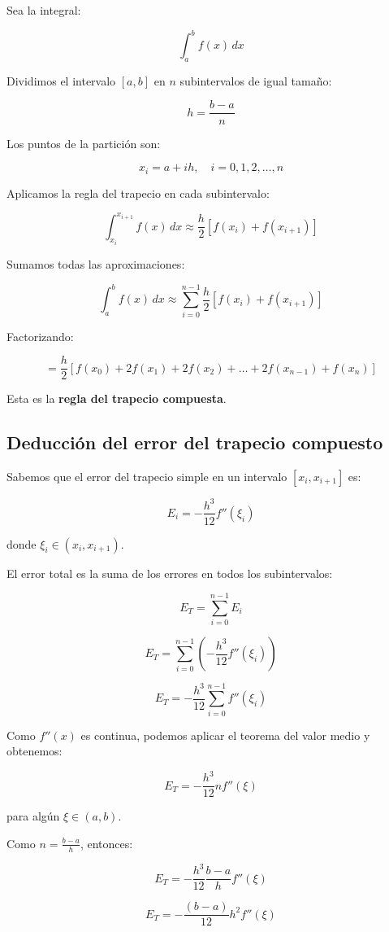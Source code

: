 \documentclass[12pt,a4paper]{article}
\begin{document}
Sea la integral:

\[
\int_a^b f(x)\,dx
\]

Dividimos el intervalo $[a,b]$ en $n$ subintervalos de igual tamaño:

\[
h = \frac{b-a}{n}
\]

Los puntos de la partición son:

\[
x_i = a + ih, \quad i = 0,1,2,\dots,n
\]

Aplicamos la regla del trapecio en cada subintervalo:

\[
\int_{x_i}^{x_{i+1}} f(x)\,dx \approx \frac{h}{2}\left[f(x_i) + f(x_{i+1})\right]
\]

Sumamos todas las aproximaciones:

\[
\int_a^b f(x)\,dx \approx \sum_{i=0}^{n-1} \frac{h}{2}\left[f(x_i) + f(x_{i+1})\right]
\]

Factorizando:

\[
= \frac{h}{2} \left[
f(x_0) + 2f(x_1) + 2f(x_2) + \dots + 2f(x_{n-1}) + f(x_n)
\right]
\]

Esta es la \textbf{regla del trapecio compuesta}.

\subsection{Deducción del error del trapecio compuesto}

Sabemos que el error del trapecio simple en un intervalo $[x_i, x_{i+1}]$ es:

\[
E_i = -\frac{h^3}{12} f''(\xi_i)
\]

donde $\xi_i \in (x_i, x_{i+1})$.

El error total es la suma de los errores en todos los subintervalos:

\[
E_T = \sum_{i=0}^{n-1} E_i
\]

\[
E_T = \sum_{i=0}^{n-1} \left(-\frac{h^3}{12} f''(\xi_i)\right)
\]

\[
E_T = -\frac{h^3}{12} \sum_{i=0}^{n-1} f''(\xi_i)
\]

Como $f''(x)$ es continua, podemos aplicar el teorema del valor medio y obtenemos:

\[
E_T = -\frac{h^3}{12} n f''(\xi)
\]

para algún $\xi \in (a,b)$.

Como $n = \frac{b-a}{h}$, entonces:

\[
E_T = -\frac{h^3}{12} \frac{b-a}{h} f''(\xi)
\]

\[
E_T = -\frac{(b-a)}{12} h^2 f''(\xi)
\]
\end{document}
